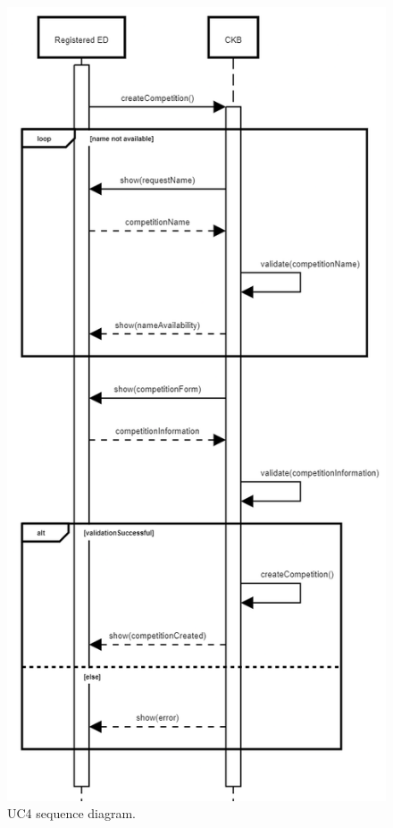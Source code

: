 \begin{center}
  \begin{figure} [H]
    \begin{center}
        \includegraphics[width=\textwidth,height=\textheight,keepaspectratio]{Images/UseCaseDiagrams/UC4.png}
        \caption{UC4 sequence diagram.}
        \label{fig: UC4_sequence_diagram}
    \end{center}
  \end{figure}
\end{center}

